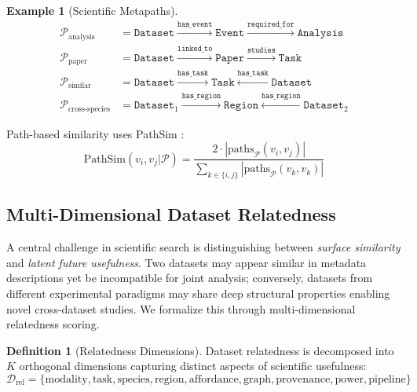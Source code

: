 \documentclass{article}
\theoremstyle{definition}
\newtheorem{definition}{Definition}[section]
\newtheorem{example}{Example}[section]
\begin{document}
\begin{example}[Scientific Metapaths]
\begin{align*}
\mathcal{P}_{\text{analysis}} &= \texttt{Dataset} \xrightarrow{\texttt{has\_event}} \texttt{Event} \xrightarrow{\texttt{required\_for}} \texttt{Analysis} \\
\mathcal{P}_{\text{paper}} &= \texttt{Dataset} \xrightarrow{\texttt{linked\_to}} \texttt{Paper} \xrightarrow{\texttt{studies}} \texttt{Task} \\
\mathcal{P}_{\text{similar}} &= \texttt{Dataset} \xrightarrow{\texttt{has\_task}} \texttt{Task} \xleftarrow{\texttt{has\_task}} \texttt{Dataset} \\
\mathcal{P}_{\text{cross-species}} &= \texttt{Dataset}_1 \xrightarrow{\texttt{has\_region}} \texttt{Region} \xleftarrow{\texttt{has\_region}} \texttt{Dataset}_2
\end{align*}
\end{example}

Path-based similarity uses PathSim \citep{sun2011pathsim}:
\begin{equation}
\text{PathSim}(v_i, v_j | \mathcal{P}) = \frac{2 \cdot |\text{paths}_\mathcal{P}(v_i, v_j)|}{\sum_{k \in \{i,j\}} |\text{paths}_\mathcal{P}(v_k, v_k)|}
\end{equation}

\subsection{Multi-Dimensional Dataset Relatedness}
\label{sec:relatedness}

A central challenge in scientific search is distinguishing between \textit{surface similarity} and \textit{latent future usefulness}. Two datasets may appear similar in metadata descriptions yet be incompatible for joint analysis; conversely, datasets from different experimental paradigms may share deep structural properties enabling novel cross-dataset studies. We formalize this through multi-dimensional relatedness scoring.

\begin{definition}[Relatedness Dimensions]
\label{def:relatedness-dims}
Dataset relatedness is decomposed into $K$ orthogonal dimensions capturing distinct aspects of scientific usefulness:
\begin{equation}
\mathcal{D}_{\text{rel}} = \{\text{modality}, \text{task}, \text{species}, \text{region}, \text{affordance}, \text{graph}, \text{provenance}, \text{power}, \text{pipeline}\}
\end{equation}
\end{definition}
\end{document}
